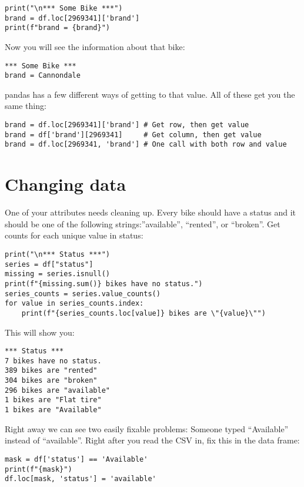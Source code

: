\begin{Verbatim}
print("\n*** Some Bike ***")
brand = df.loc[2969341]['brand']
print(f"brand = {brand}")
\end{Verbatim}

Now you will see the information about that bike:

\begin{Verbatim}
*** Some Bike ***
brand = Cannondale
\end{Verbatim}

pandas has a few different ways of getting to that value.  All of these get you the same thing:
\begin{Verbatim}
brand = df.loc[2969341]['brand'] # Get row, then get value
brand = df['brand'][2969341]     # Get column, then get value
brand = df.loc[2969341, 'brand'] # One call with both row and value
\end{Verbatim}

\section{Changing data}

One of your attributes needs cleaning up. Every bike should have a
status and it should be one of the following strings:''available'',
``rented'', or ``broken''.  Get counts for each unique value in
status:

\begin{Verbatim}
print("\n*** Status ***")
series = df["status"]
missing = series.isnull()
print(f"{missing.sum()} bikes have no status.")
series_counts = series.value_counts()
for value in series_counts.index:
    print(f"{series_counts.loc[value]} bikes are \"{value}\"")
\end{Verbatim}

This will show you:

\begin{Verbatim}
*** Status ***
7 bikes have no status.
389 bikes are "rented"
304 bikes are "broken"
296 bikes are "available"
1 bikes are "Flat tire"
1 bikes are "Available"
\end{Verbatim}

Right away we can see two easily fixable problems: Someone typed
``Available'' instead of ``available''.  Right after you read the CSV
in, fix this in the data frame:

\begin{Verbatim}
mask = df['status'] == 'Available'
print(f"{mask}")
df.loc[mask, 'status'] = 'available'
\end{Verbatim}

